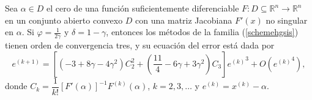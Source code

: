\begin{theorem} \label{t1}
	Sea $\alpha \in  D$ el cero de una función suficientemente diferenciable $F : D \subseteq \mathbb{R}^n \to \mathbb{R}^n$ en un conjunto abierto convexo $D$ con una matriz Jacobiana $F'(x)$ no singular en $\alpha$. Si $\varphi=\frac{1}{2\gamma}$ y $\delta=1-\gamma$, entonces los métodos de la familia (\ref{schemehgsis}) tienen orden de convergencia tres, y su ecuación del error está dada por
	\begin{equation*}
	e^{(k+1)} = \left[ \left( -3+8\gamma-4\gamma^2 \right)C_2^2+\left( \frac{11}{4}-6\gamma+3\gamma^2\right)C_3 \right] {e^{(k)}}^3+O({e^{(k)}}^4),
	\end{equation*}
	donde $C_k=\dfrac{1}{k!}[F'(\alpha)]^{-1}F^{(k)}(\alpha)$,   $k=2,3, \ldots$  y $e^{(k)}=x^{(k)}-\alpha$.
\end{theorem}
